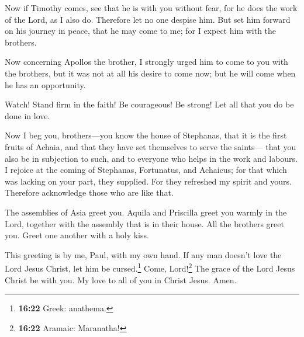  Now if Timothy comes, see that he is with you without
fear, for he does the work of the Lord, as I also do. 
Therefore let no one despise him. But set him forward on his journey in
peace, that he may come to me; for I expect him with the brothers.

 Now concerning Apollos the brother, I strongly urged him
to come to you with the brothers, but it was not at all his desire to
come now; but he will come when he has an opportunity.

 Watch! Stand firm in the faith! Be courageous! Be
strong!  Let all that you do be done in love.

 Now I beg you, brothers---you know the house of
Stephanas, that it is the first fruits of Achaia, and that they have set
themselves to serve the saints---  that you also be in
subjection to such, and to everyone who helps in the work and labours.
 I rejoice at the coming of Stephanas, Fortunatus, and
Achaicus; for that which was lacking on your part, they supplied.
 For they refreshed my spirit and yours. Therefore
acknowledge those who are like that.

 The assemblies of Asia greet you. Aquila and Priscilla
greet you warmly in the Lord, together with the assembly that is in
their house.  All the brothers greet you. Greet one
another with a holy kiss.

 This greeting is by me, Paul, with my own hand.
 If any man doesn't love the Lord Jesus Christ, let him
be cursed.\footnote{\textbf{16:22} Greek: anathema.} Come,
Lord!\footnote{\textbf{16:22} Aramaic: Maranatha!}  The
grace of the Lord Jesus Christ be with you.  My love to
all of you in Christ Jesus. Amen.
